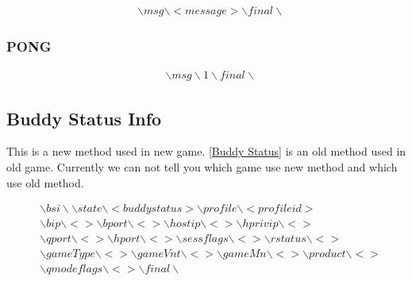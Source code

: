 \documentclass[oneside,titlepage,a4paper]{Definition/retrospy} %
\begin{document}
\begin{tcolorbox}
	\begin{equation}
	\begin{split}
	& \backslash msg \backslash <message> \backslash final \backslash
	\end{split}
	\end{equation}
\end{tcolorbox}

\subsubsection{PONG}

\begin{tcolorbox}
	\begin{equation}
	\begin{split}
	& \backslash msg \backslash 1 \backslash final \backslash
	\end{split}
	\end{equation}
\end{tcolorbox}


\subsection{Buddy Status Info}\label{Buddy Status Info}
This is a new method used in new game. \ref{Buddy Status} is an old method used in old game. Currently we can not tell you which game use new method and which use old method.
\begin{tcolorbox}\label{Buddy status info string}
	\begin{equation}
	\begin{split}
	&\backslash bsi \backslash \backslash state\backslash <buddy status> \backslash profile \backslash <profileid>  \\
	&\backslash bip \backslash <> \backslash bport \backslash <> \backslash hostip \backslash <> \backslash hprivip \backslash <> \\
	&\backslash qport \backslash <> \backslash hport \backslash <> \backslash sessflags \backslash <> \backslash rstatus \backslash <> \\
	& \backslash gameType \backslash <> \backslash  gameVnt \backslash <> \backslash gameMn \backslash <> \backslash product \backslash <> \\
	& \backslash qmodeflags \backslash <> \backslash final \backslash 
	\end{split}
	\end{equation}
\end{tcolorbox}
\end{document}
